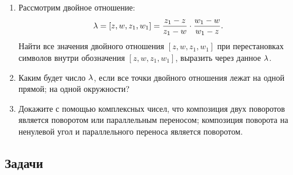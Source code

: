 \begin{enumerate}
\item Рассмотрим двойное отношение:
$$
\lambda= [z,w,z_1,w_1] = \frac{z_1-z}{z_1-w}\cdot\frac{w_1-w}{w_1-z}.
$$
Найти все значения двойного отношения $[z,w,z_1,w_1]$ при перестановках символов внутри обозначения $[z,w,z_1,w_1]$, выразить через данное $\lambda$.

\item Каким будет число $\lambda$, если все точки двойного отношения лежат \ipunkt на одной прямой; \ipunkt на одной окружности?

\item Докажите с помощью комплексных чисел, что
\ipunkt композиция двух поворотов является поворотом или параллельным переносом;
\ipunkt композиция поворота на ненулевой угол и параллельного переноса является поворотом.

\end{enumerate}

\subsection*{Задачи}

